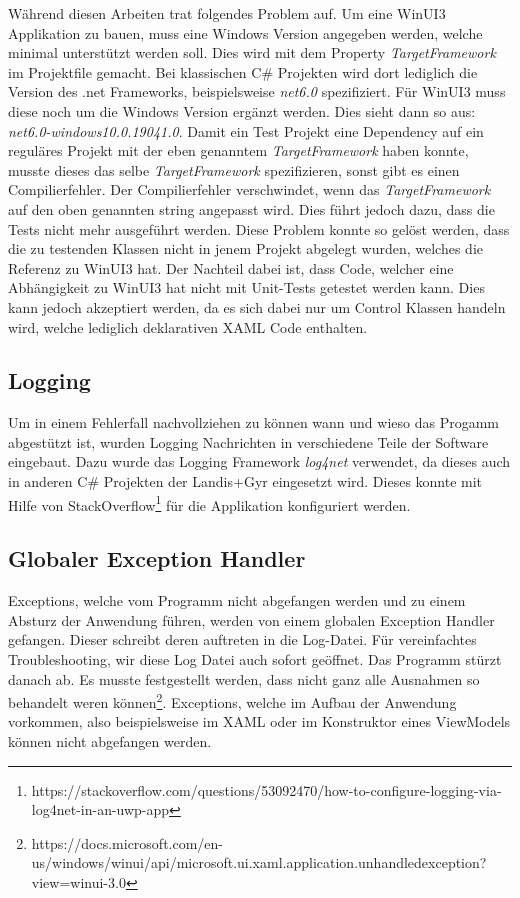 Während diesen Arbeiten trat folgendes Problem auf.
Um eine WinUI3 Applikation zu bauen, muss eine Windows Version angegeben werden, welche minimal unterstützt werden soll.
Dies wird mit dem Property \textit{TargetFramework} im Projektfile gemacht.
Bei klassischen C\# Projekten wird dort lediglich die Version des .net Frameworks, beispielsweise \textit{net6.0} spezifiziert.
Für WinUI3 muss diese noch um die Windows Version ergänzt werden.
Dies sieht dann so aus: \textit{net6.0-windows10.0.19041.0}.
Damit ein Test Projekt eine Dependency auf ein reguläres Projekt mit der eben genanntem \textit{TargetFramework} haben konnte, musste dieses das selbe \textit{TargetFramework} spezifizieren, sonst gibt es einen Compilierfehler.
Der Compilierfehler verschwindet, wenn das \textit{TargetFramework} auf den oben genannten string angepasst wird.
Dies führt jedoch dazu, dass die Tests nicht mehr ausgeführt werden.
Diese Problem konnte so gelöst werden, dass die zu testenden Klassen nicht in jenem Projekt abgelegt wurden, welches die Referenz zu WinUI3 hat.
Der Nachteil dabei ist, dass Code, welcher eine Abhängigkeit zu WinUI3 hat nicht mit Unit-Tests getestet werden kann.
Dies kann jedoch akzeptiert werden, da es sich dabei nur um Control Klassen handeln wird, welche lediglich deklarativen XAML Code enthalten.

\subsection{Logging}
Um in einem Fehlerfall nachvollziehen zu können wann und wieso das Progamm abgestützt ist, wurden Logging Nachrichten in verschiedene Teile der Software eingebaut.
Dazu wurde das Logging Framework \textit{log4net} verwendet, da dieses auch in anderen C\# Projekten der Landis+Gyr eingesetzt wird.
Dieses konnte mit Hilfe von StackOverflow\footnote{https://stackoverflow.com/questions/53092470/how-to-configure-logging-via-log4net-in-an-uwp-app} für die Applikation konfiguriert werden.

\subsection{Globaler Exception Handler}
Exceptions, welche vom Programm nicht abgefangen werden und zu einem Absturz der Anwendung führen, werden von einem globalen Exception Handler gefangen.
Dieser schreibt deren auftreten in die Log-Datei. 
Für vereinfachtes Troubleshooting, wir diese Log Datei auch sofort geöffnet.
Das Programm stürzt danach ab.
Es musste festgestellt werden, dass nicht ganz alle Ausnahmen so behandelt weren können\footnote{https://docs.microsoft.com/en-us/windows/winui/api/microsoft.ui.xaml.application.unhandledexception?view=winui-3.0}.
Exceptions, welche im Aufbau der Anwendung vorkommen, also beispielsweise im XAML oder im Konstruktor eines ViewModels können nicht abgefangen werden.


\pagebreak

